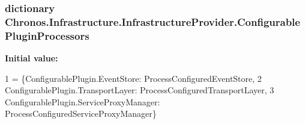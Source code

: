 \subsubsection[{\texorpdfstring{Configurable\+Plugin\+Processors}{ConfigurablePluginProcessors}}]{\setlength{\rightskip}{0pt plus 5cm}dictionary Chronos.\+Infrastructure.\+Infrastructure\+Provider.\+Configurable\+Plugin\+Processors\hspace{0.3cm}{\ttfamily [static]}}\hypertarget{group__Chronos_ga1cace3ea2745c6a69b8324a786403ebd}{}\label{group__Chronos_ga1cace3ea2745c6a69b8324a786403ebd}
{\bfseries Initial value\+:}
\begin{DoxyCode}
1 = \{ConfigurablePlugin.EventStore: ProcessConfiguredEventStore,
2                                     ConfigurablePlugin.TransportLayer: ProcessConfiguredTransportLayer,
3                                     ConfigurablePlugin.ServiceProxyManager: 
      ProcessConfiguredServiceProxyManager\}
\end{DoxyCode}
